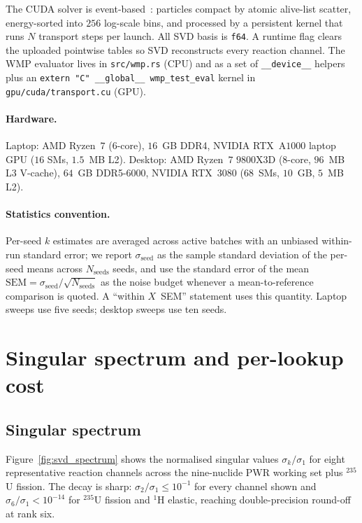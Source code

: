 \documentclass[11pt,a4paper]{article}
\begin{document}
The CUDA solver is event-based~\cite{tramm2024}: particles
compact by atomic alive-list scatter, energy-sorted into
$256$ log-scale bins, and processed by a persistent kernel
that runs $N$ transport steps per launch. All SVD basis is
\texttt{f64}. A runtime flag clears the uploaded pointwise
tables so SVD reconstructs every reaction channel. The WMP
evaluator lives in \texttt{src/wmp.rs} (CPU) and as a set of
\texttt{\_\_device\_\_} helpers plus an
\texttt{extern "C" \_\_global\_\_ wmp\_test\_eval} kernel in
\texttt{gpu/cuda/transport.cu} (GPU).

\paragraph{Hardware.}
Laptop: AMD Ryzen~$7$ (6-core), $16$~GB DDR4, NVIDIA
RTX~A$1000$ laptop GPU ($16$ SMs, $1.5$~MB L2). Desktop: AMD
Ryzen~$7$ $9800$X3D (8-core, $96$~MB L3 V-cache), $64$~GB
DDR5-$6000$, NVIDIA RTX~$3080$ ($68$~SMs, $10$~GB, $5$~MB L2).

\paragraph{Statistics convention.}
Per-seed $k$ estimates are averaged across active batches
with an unbiased within-run standard error; we report
$\sigma_\text{seed}$ as the sample standard deviation of the
per-seed means across $N_\text{seeds}$ seeds, and use the
standard error of the mean $\mathrm{SEM} =
\sigma_\text{seed} / \sqrt{N_\text{seeds}}$ as the noise
budget whenever a mean-to-reference comparison is quoted. A
``within $X$~SEM'' statement uses this quantity. Laptop
sweeps use five seeds; desktop sweeps use ten seeds.

\section{Singular spectrum and per-lookup cost}
\label{sec:xs_pareto}

\subsection{Singular spectrum}
\label{sec:spectrum}

Figure~\ref{fig:svd_spectrum} shows the normalised singular
values $\sigma_k / \sigma_1$ for eight representative reaction
channels across the nine-nuclide PWR working set plus
$^{235}$U fission. The decay is sharp:
$\sigma_2/\sigma_1 \leq 10^{-1}$ for every channel shown and
$\sigma_6/\sigma_1 < 10^{-14}$ for $^{235}$U fission and
$^{1}$H elastic, reaching double-precision round-off at
rank six.
\end{document}
